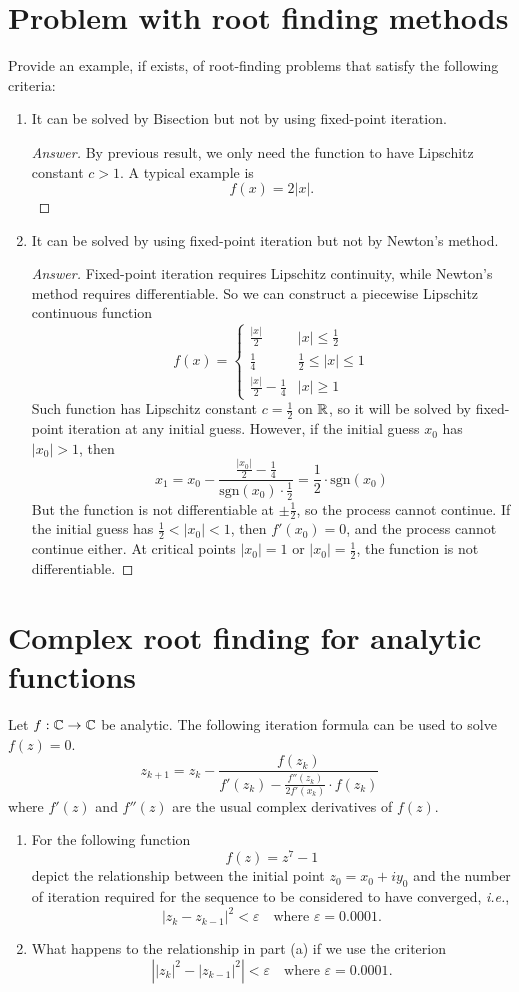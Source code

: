 \section{Problem with root finding methods}
Provide an example, if exists, of root-finding problems that satisfy the following criteria:
\begin{enumerate}
	\item It can be solved by Bisection but not by using fixed-point iteration.
	\begin{proof}[Answer]
		By previous result, we only need the function to have Lipschitz constant \(c>1\).
		A typical example is
		\[ f(x)=2|x|. \]
	\end{proof}
	\item It can be solved by using fixed-point iteration but not by Newton's method.
	\begin{proof}[Answer]
		Fixed-point iteration requires Lipschitz continuity, while Newton's method requires differentiable.
		So we can construct a piecewise Lipschitz continuous function
		\[ f(x)=\begin{cases}
		\frac{\left| x\right| }{2} & |x|\leq \frac{1}{2} \\
		\frac{1}{4} &  \frac{1}{2}\leq |x| \leq 1 \\
		\frac{\left| x\right| }{2}-\frac{1}{4} & |x|\geq 1
		\end{cases} \]
		Such function has Lipschitz constant \(c=\frac{1}{2}\) on \(\mathbb{R}\), so it will be solved by fixed-point iteration at any initial guess.
		However, if the initial guess \(x_0\) has \(|x_0|>1\), then
		\[ x_1=x_0-\frac{\frac{|x_0|}{2}-\frac{1}{4}}{\text{sgn}{(x_0)}\cdot\frac{1}{2}}=\frac{1}{2}\cdot\text{sgn}{(x_0)} \]
		But the function is not differentiable at \(\pm\frac{1}{2}\), so the process cannot continue.
		If the initial guess has \(\frac{1}{2}<|x_0|<1\), then \(f'(x_0)=0\), and the process cannot continue either.
		At critical points \(|x_0|=1\) or \(|x_0|=\frac{1}{2}\), the function is not differentiable.
	\end{proof}
\end{enumerate}


\section{Complex root finding for analytic functions}
Let \(f:\mathbb{C}\to\mathbb{C}\) be analytic.
The following iteration formula can be used to solve \(f(z)=0\).
\[ z_{k+1}=z_k-\frac{f(z_k)}{f'(z_k)-\frac{f''(z_k)}{2f'(x_k)}\cdot f(z_k)} \]
where \(f'(z)\) and \(f''(z)\) are the usual complex derivatives of \(f(z)\).
\begin{enumerate}
	\item For the following function
	\[ f(z)=z^7-1 \]
	depict the relationship between the initial point \(z_0=x_0+i y_0\) and the number of iteration required for the sequence to be considered to have converged, \textit{i.e.},
	\[ |z_k - z_{k-1}|^2 < \varepsilon \quad \text{where } \varepsilon=0.0001. \]
	\item What happens to the relationship in part (a) if we use the criterion 
	\[ \left| |z_k|^2 - |z_{k-1}|^2\right| < \varepsilon \quad \text{where } \varepsilon=0.0001. \]
\end{enumerate}
